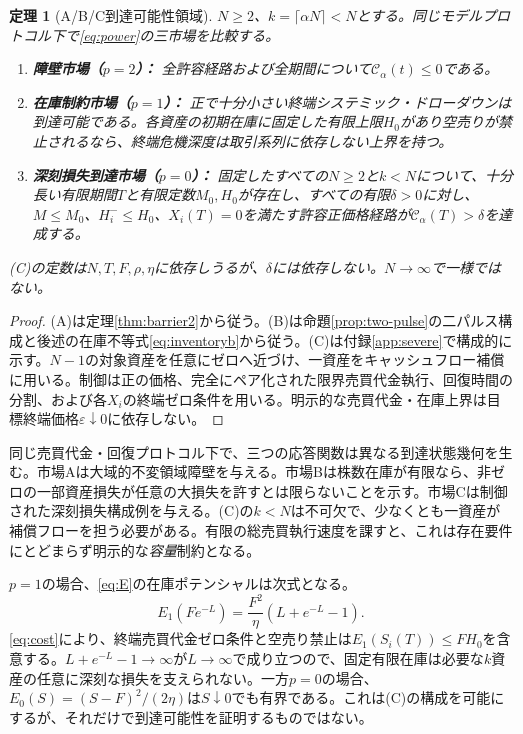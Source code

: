 \documentclass[11pt]{article}
\numberwithin{equation}{section}
\newtheorem{theorem}{定理}[section]
\theoremstyle{definition}
\theoremstyle{remark}
\newcommand{\Cris}{\mathcal{C}}
\begin{document}
\begin{theorem}[A/B/C到達可能性領域]\label{thm:ABC}
$N\ge2$、$k=\lceil\alpha N\rceil<N$とする。同じモデルプロトコル下で\eqref{eq:power}の三市場を比較する。
\begin{enumerate}[label=\textup{(\Alph*)},leftmargin= 2 em,itemsep= 0.15 em]
\item \textbf{障壁市場（$p=2$）：} 全許容経路および全期間について$\Cris_\alpha(t)\le0$である。
\item \textbf{在庫制約市場（$p=1$）：} 正で十分小さい終端システミック・ドローダウンは到達可能である。各資産の初期在庫に固定した有限上限$H_0$があり空売りが禁止されるなら、終端危機深度は取引系列に依存しない上界を持つ。
\item \textbf{深刻損失到達市場（$p=0$）：} 固定したすべての$N\ge2$と$k<N$について、十分長い有限期間$T$と有限定数$M_0,H_0$が存在し、\emph{すべての}有限$\delta>0$に対し、$M\le M_0$、$H_i^-\le H_0$、$X_i(T)=0$を満たす許容正価格経路が$\Cris_\alpha(T)>\delta$を達成する。
\end{enumerate}
(C)の定数は$N,T,F,\rho,\eta$に依存しうるが、$\delta$には依存しない。$N\to\infty$で一様ではない。
\end{theorem}
\begin{proof}
(A)は定理\ref{thm:barrier2}から従う。(B)は命題\ref{prop:two-pulse}の二パルス構成と後述の在庫不等式\eqref{eq:inventoryb}から従う。(C)は付録\ref{app:severe}で構成的に示す。$N-1$の対象資産を任意にゼロへ近づけ、一資産をキャッシュフロー補償に用いる。制御は正の価格、完全にペア化された限界売買代金執行、回復時間の分割、および各$X_i$の終端ゼロ条件を用いる。明示的な売買代金・在庫上界は目標終端価格$\varepsilon\downarrow0$に依存しない。
\end{proof}

同じ売買代金・回復プロトコル下で、三つの応答関数は異なる到達状態幾何を生む。市場Aは大域的不変領域障壁を与える。市場Bは株数在庫が有限なら、非ゼロの一部資産損失が任意の大損失を許すとは限らないことを示す。市場Cは制御された深刻損失構成例を与える。(C)の$k<N$は不可欠で、少なくとも一資産が補償フローを担う必要がある。有限の総売買執行速度を課すと、これは存在要件にとどまらず明示的な\emph{容量}制約となる。

$p=1$の場合、\eqref{eq:E}の在庫ポテンシャルは次式となる。
\begin{equation}\label{eq:inventoryb}
E_1(Fe^{-L})=\frac{F^2}{\eta}\left(L+e^{-L}-1\right).
\end{equation}
\eqref{eq:cost}により、終端売買代金ゼロ条件と空売り禁止は$E_1(S_i(T))\le FH_0$を含意する。$L+e^{-L}-1\to\infty$が$L\to\infty$で成り立つので、固定有限在庫は必要な$k$資産の任意に深刻な損失を支えられない。一方$p=0$の場合、$E_0(S)=(S-F)^2/(2\eta)$は$S\downarrow0$でも有界である。これは(C)の構成を可能にするが、それだけで到達可能性を証明するものではない。
\end{document}

